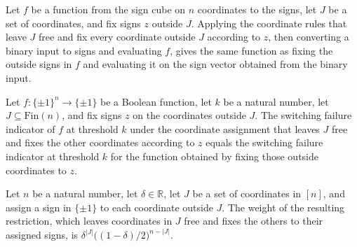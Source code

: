 \begin{theorem}
\label{FABL.restrict_coordRestrictionOf}
\leanok
{}
Let $f$ be a function from the sign cube on $n$ coordinates to the signs, let $J$ be a
set of coordinates, and fix signs $z$ outside $J$. Applying the coordinate rules that
leave $J$ free and fix every coordinate outside $J$ according to $z$, then converting a
binary input to signs and evaluating $f$, gives the same function as fixing the outside
signs in $f$ and evaluating it on the sign vector obtained from the binary input.
\end{theorem}

\begin{theorem}
\label{FABL.coordSwitchingFailureIndicator_coordRestrictionOf}
\leanok
{}
Let $f:\{\pm1\}^n\to\{\pm1\}$ be a Boolean function, let $k$ be a natural number, let
$J\subseteq\text{Fin}(n)$, and fix signs $z$ on the coordinates outside $J$. The
switching failure indicator of $f$ at threshold $k$ under the coordinate assignment that
leaves $J$ free and fixes the other coordinates according to $z$ equals the switching
failure indicator at threshold $k$ for the function obtained by fixing those outside
coordinates to $z$.
\end{theorem}

\begin{theorem}
\label{FABL.restrictionAssignmentWeightAt_coordRestrictionOf}
\leanok
{}
Let $n$ be a natural number, let $\delta\in\mathbb R$, let $J$ be a set of coordinates
in $[n]$, and assign a sign in $\{\pm1\}$ to each coordinate outside $J$. The weight of
the resulting restriction, which leaves coordinates in $J$ free and fixes the others to
their assigned signs, is $\delta^{|J|}\bigl((1-\delta)/2\bigr)^{n-|J|}$.
\end{theorem}

